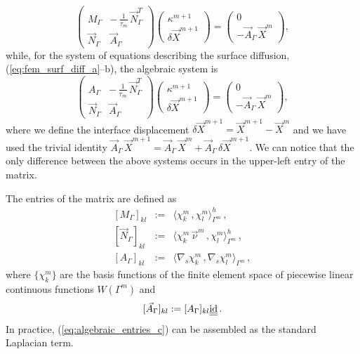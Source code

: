 \begin{equation}\label{eq:algebraic_mean_curvature}
\begin{pmatrix}
M_\Gamma & -\,\frac{1}{\tau_m} \, \vec N_\Gamma^T \\
\vec N_\Gamma & \vec A_\Gamma
\end{pmatrix}
\begin{pmatrix}
\kappa^{m + 1} \\
\delta \vec X^{m + 1}
\end{pmatrix}
=
\begin{pmatrix}
0 \\
- \vec A_\Gamma \, \vec X^m
\end{pmatrix} ,
\end{equation}
while, for the system of equations describing the surface diffusion,
(\ref{eq:fem_surf_diff_a}--b), the algebraic system is
\begin{equation}\label{eq:algebraic_surf_diff}
\begin{pmatrix}
A_\Gamma & - \,\frac{1}{\tau_m}\, \vec N_\Gamma^T \\
\vec N_\Gamma & \vec A_\Gamma
\end{pmatrix}
\begin{pmatrix}
\kappa^{m + 1} \\
\delta \vec X^{m + 1}
\end{pmatrix}
=
\begin{pmatrix}
0 \\
- \vec A_\Gamma \, \vec X^m
\end{pmatrix},
\end{equation}
where we define the interface displacement $\delta \vec X^{m + 1}=\vec X^{m +
1} - \vec X^m$ and we have used the trivial identity $\vec A_\Gamma\,\vec
X^{m+1} = \vec A_\Gamma\,\vec X^m + \vec A_\Gamma\,\delta \vec X^{m+1}$. We can
notice that the only difference between the above systems occurs in the
upper-left entry of the matrix.

The entries of the matrix are defined as
\begin{eqnarray}
\left[ M_\Gamma \right]_{kl} & := & \langle \chi_k^m \, , \chi_l^m
\rangle_{\Gamma^m}^h\,,\label{eq:algebraic_entries_a} \\
\left[ \vec N_\Gamma \right]_{kl} & := & \langle \chi_k^m \, \vec \nu^m\,,
\chi_l^m \rangle_{\Gamma^m}^h\,,\label{eq:algebraic_entries_b} \\
\left[ A_\Gamma \right]_{kl} & := & \langle \nabla_s \chi_k^m \, , \nabla_s
\chi_l^m \rangle_{\Gamma^m}\,,\label{eq:algebraic_entries_c}
\end{eqnarray}
where $\{\chi_k^m\}$ are the basis functions of the finite element space of
piecewise linear continuous functions $W(\Gamma^m)$ and
\begin{equation}\label{eq:algebraic_entries_d}
[\vec A_\Gamma]_{kl} := [A_\Gamma]_{kl} \mat \id\,.
\end{equation}
In practice, (\ref{eq:algebraic_entries_c}) can be assembled as the standard
Laplacian term.

